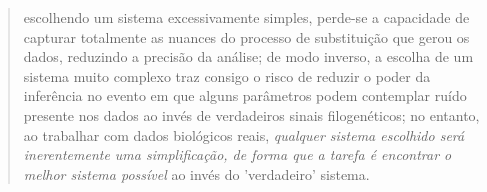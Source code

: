 \documentclass[english,brazilian]{UNISINOSmonografia} %
\begin{document}


\begin{quote}
	escolhendo um sistema excessivamente simples, perde-se a capacidade de capturar totalmente as nuances do processo de substituição que gerou os dados, reduzindo a precisão da análise;
	de modo inverso, a escolha de um sistema muito complexo traz consigo o risco de reduzir o poder da inferência no evento em que alguns parâmetros podem contemplar ruído presente nos dados ao invés de verdadeiros sinais filogenéticos;
	no entanto, ao trabalhar com dados biológicos reais, \emph{qualquer sistema escolhido será inerentemente uma simplificação, de forma que a tarefa é encontrar o melhor sistema possível} ao invés do 'verdadeiro' sistema.
\end{quote}


\end{document}
